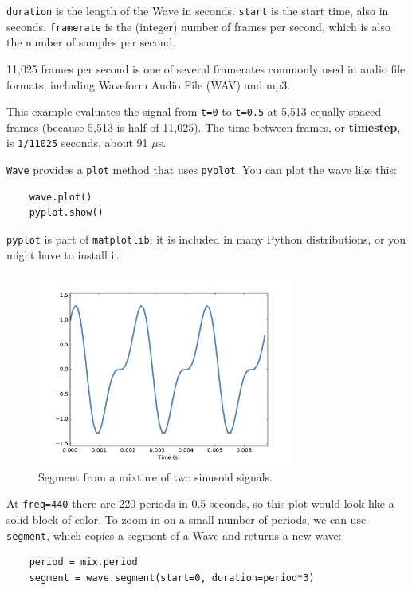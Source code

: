 \documentclass[12pt]{book}
\begin{document}
{\tt duration} is the length of the Wave in seconds.  {\tt start} is
the start time, also in seconds.  {\tt framerate} is the (integer)
number of frames per second, which is also the number of samples
per second.

11,025 frames per second is one of several framerates commonly used in
audio file formats, including Waveform Audio File (WAV) and mp3. 

This example evaluates the signal from {\tt t=0} to {\tt t=0.5} at
5,513 equally-spaced frames (because 5,513 is half of 11,025).
The time between frames, or {\bf timestep}, is {\tt 1/11025} seconds, about
91 $\mu$s.

{\tt Wave} provides a {\tt plot} method that uses {\tt pyplot}.
You can plot the wave like this:

\begin{verbatim}
    wave.plot()
    pyplot.show()
\end{verbatim}

{\tt pyplot} is part of {\tt matplotlib}; it is included in many
Python distributions, or you might have to install it.

\begin{figure}
\centerline{\includegraphics[height=2.5in]{figs/sounds4.pdf}}
\caption{Segment from a mixture of two sinusoid signals.}
\label{fig.sounds4}
\end{figure}

At {\tt freq=440} there are 220 periods in 0.5 seconds, so this plot
would look like a solid block of color.  To zoom in on a small number
of periods, we can use {\tt segment}, which copies a segment of a Wave
and returns a new wave:

\begin{verbatim}
    period = mix.period
    segment = wave.segment(start=0, duration=period*3)
\end{verbatim}
\end{document}
